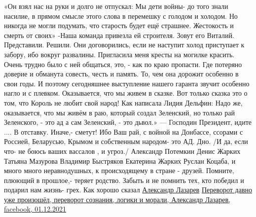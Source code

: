 \begin{multicols}{2}
«Он взял нас на руки и долго не отпускал:
Мы дети войны- до того знали насилие, 
в прямом смысле этого слова в перемешку с голодом и холодом. 
Но никогда не могли подумать, что старость будет ещё страшнее. Жестокость и смерть от своих» 
-Наша команда привезла  ей  строителя. Зовут его Виталий. Представили.  Решили.
Они договорились, если не наступит холод приступает к забору, 
ибо вокруг развалины.  Пригласила меня кресты на могилке красить.
Очень трудно было с ней общаться, это, - как по краю пропасти. 
Где потеряно доверие и обманута совесть, честь и память. 
То, чем она дорожит особенно в свои годы.
И поэтому сегодняшнее выступление нашего гаранта звучит особенно нагло и с плевком.  Оказывается, что мы живем в сказке. 
Вот только сказка это о том, что Король не любит свой народ!
Как написала Лидия Дельфин:
Надо же, оказывается, что мы живём в раю, который создал Зеленский, но только рай Зеленского, - это ад а сам Зеленский, - это дьвол.»
 —
Господин Президент, идите .... В отставку. Иначе,- сметут!
Ибо Ваш рай, с войной на Донбассе, ссорами с Россией, Беларусью, Крымом и собственным народом- это АД. Дно.
/И да, если что- не боюсь ваших вассалов , и угроз./
Александр Потемкин
Денис Жарких
Татьяна Мазурова
Владимир Быстряков
Екатерина Жарких
Руслан Коцаба, и много много  неравнодушных, к происходящему в стране - друзей. Помните, плюющий в прошлое,- теряет родство. 
Забыть и не помнить тех, кто победил и подарил нам жизнь- грех.
Как хорошо сказал \href{https://www.facebook.com/profile.php?id=100008532614385}{Александр Лазарев}
\href{https://www.facebook.com/100008532614385/posts/2735352603425800/}{%
Переворот давно уже произошёл, переворот сознания, логики и морали, Александр Лазарев, facebook, %
01.12.2021%
}
\end{multicols}

